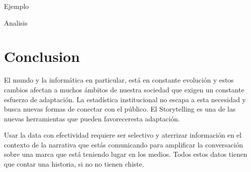 \documentclass[preprint,12pt]{elsarticle}
\begin{document}
	

\begin{LARGE}
		Ejemplo\\
	\end{LARGE}
	
	\begin{LARGE}
		Analisis\\
	\end{LARGE}
\newpage

	
\section{Conclusion}

		El mundo y la informática en particular, está en constante evolución y estos cambios afectan a muchos ámbitos de nuestra sociedad que exigen un constante esfuerzo de adaptación.
La estadística institucional no escapa a esta necesidad y busca nuevas formas de conectar con el público. El Storytelling es una de las nuevas herramientas que pueden favoreceresta adaptación.

Usar la data con efectividad requiere ser selectivo y aterrizar información en el contexto de la narrativa que estás comunicando para amplificar la conversación sobre una marca que está teniendo lugar en los medios. Todos estos datos tienen que contar una historia, si no no tienen chiste. \\
	

	
	
	\newpage
	
	
	
	
	
\end{document}
